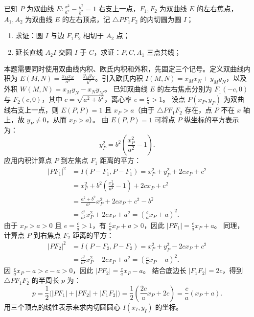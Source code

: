 \begin{exercise}
已知 \(P\) 为双曲线 \(E: \frac{x^2}{a^2} - \frac{y^2}{b^2} = 1\) 右支上一点，\(F_1,F_2\) 为双曲线 \(E\) 的左右焦点，\(A_1,A_2\) 为双曲线 \(E\) 的左右顶点，记 \(\triangle PF_1F_2\) 的内切圆为圆 \(I\)；
\begin{enumerate}
    \item[(1)] 求证：圆 \(I\) 与边 \(F_1F_2\) 相切于 \(A_2\) 点；
    \item[(2)] 延长直线 \(A_2I\) 交圆 \(I\) 于 \(C\)，求证：\(P,C,A_1\) 三点共线；
\end{enumerate}
\end{exercise}
\begin{solution}
本题需要同时使用双曲线内积、欧氏内积和外积，先固定三个记号。定义双曲线内积为 $E(M, N) = \frac{x_M x_N}{a^2} - \frac{y_M y_N}{b^2}$。引入欧氏内积 $I(M, N) = x_M x_N + y_M y_N$，以及外积 $W(M, N) = x_M y_N - x_N y_M$。
已知双曲线 $E$ 的左右焦点分别为 $F_1(-c, 0)$ 与 $F_2(c, 0)$，其中 $c = \sqrt{a^2 + b^2}$，离心率 $e = \frac{c}{a} > 1$。
设点 $P(x_P, y_P)$ 为双曲线右支上一点，则 $E(P, P) = 1$ 且 $x_P > a$（由于 $\triangle PF_1F_2$ 存在，点 $P$ 不在 $x$ 轴上，故 $y_P \neq 0$，从而 $x_P > a$）。
由 $E(P, P) = 1$ 可将点 $P$ 纵坐标的平方表示为：
\[ y_P^2 = b^2 \left( \frac{x_P^2}{a^2} - 1 \right). \]
应用内积计算点 $P$ 到左焦点 $F_1$ 距离的平方：
\begin{align*}
|PF_1|^2 &= I(P - F_1, P - F_1) = x_P^2 + y_P^2 + 2cx_P + c^2 \\
&= x_P^2 + b^2 \left( \frac{x_P^2}{a^2} - 1 \right) + 2cx_P + c^2 \\
&= \frac{a^2+b^2}{a^2} x_P^2 + 2cx_P + c^2 - b^2 \\
&= \frac{c^2}{a^2} x_P^2 + 2cx_P + a^2 = \left( \frac{c}{a} x_P + a \right)^2.
\end{align*}
由于 $x_P > a > 0$ 且 $e = \frac{c}{a} > 1$，有 $\frac{c}{a} x_P + a > 0$，因此 $|PF_1| = \frac{c}{a} x_P + a$。
同理，计算点 $P$ 到右焦点 $F_2$ 距离的平方：
\begin{align*}
|PF_2|^2 &= I(P - F_2, P - F_2) = x_P^2 + y_P^2 - 2cx_P + c^2 \\
&= \frac{c^2}{a^2} x_P^2 - 2cx_P + a^2 = \left( \frac{c}{a} x_P - a \right)^2.
\end{align*}
因 $\frac{c}{a} x_P - a > c - a > 0$，因此 $|PF_2| = \frac{c}{a} x_P - a$。
结合底边长 $|F_1F_2| = 2c$，得到 $\triangle PF_1F_2$ 的半周长 $p$ 为：
\[ p = \frac{1}{2} \big( |PF_1| + |PF_2| + |F_1F_2| \big) = \frac{1}{2} \left( \frac{2c}{a} x_P + 2c \right) = \frac{c}{a} (x_P + a). \]
用三个顶点的线性表示来求内切圆圆心 $I(x_I, y_I)$ 的坐标。

\end{solution}
